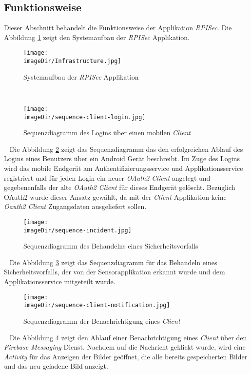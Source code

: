 \subsection{Funktionsweise}
Dieser Abschnitt behandelt die Funktionsweise der Applikation \emph{RPISec}. Die Abbildung \ref{fig:image-system-structure} zeigt den Systemaufbau der \emph{RPISec} Applikation. 
\begin{figure}[h]
	\centering
	\texttt{[image: \\imageDir/Infrastructure.jpg]}
	\caption{Systemaufbau der \emph{RPISec} Applikation}
	\label{fig:image-system-structure}
\end{figure}
\ \newpage
\begin{figure}[h]
	\centering
	\texttt{[image: \\imageDir/sequence-client-login.jpg]}
	\caption{Sequenzdiagramm des Logins über einen mobilen \emph{Client}}
	\label{fig:image-sequence-client-login}
\end{figure}
\ \newline
Die Abbildung \ref{fig:image-sequence-client-login} zeigt das Sequenzdiagramm das den erfolgreichen Ablauf des Logins eines Benutzers über ein Android Gerät beschreibt. Im Zuge des Logins wird das mobile Endgerät am Authentifizierungsservice und Applikationsservice registriert und für jeden Login ein neuer \emph{OAuth2 Client} angelegt und gegebenenfalls der alte \emph{OAuth2 Client} für dieses Endgerät gelöscht. Bezüglich OAuth2 wurde dieser Ansatz gewählt, da mit der \emph{Client}-Applikation keine \emph{Oauth2 Client} Zugangsdaten ausgeliefert sollen.
\begin{figure}[h]
	\centering
	\texttt{[image: \\imageDir/sequence-incident.jpg]}
	\caption{Sequenzdiagramm des Behandelns eines Sicherheitsvorfalls}
	\label{fig:image-sequence-incident}
\end{figure}
\ \newline
Die Abbildung \ref{fig:image-sequence-incident} zeigt das Sequenzdiagramm für das Behandeln eines Sicherheitsvorfalls, der von der Sensorapplikation erkannt wurde und dem Applikationsservice mitgeteilt wurde. 
\ \newpage 
\begin{figure}[h]
	\centering
	\texttt{[image: \\imageDir/sequence-client-notification.jpg]}
	\caption{Sequenzdiagramm der Benachrichtigung eines \emph{Client}}
	\label{fig:image-sequence-client-notification}
\end{figure}
\ \newline
Die Abbildung \ref{fig:image-sequence-client-notification} zeigt den Ablauf einer  Benachrichtigung eines \emph{Client} über den \emph{Firebase Messaging} Dienst. Nachdem auf die Nachricht geklickt wurde, wird eine \emph{Activity} für das Anzeigen der Bilder geöffnet, die alle bereits gespeicherten Bilder und das neu geladene Bild anzeigt. 
